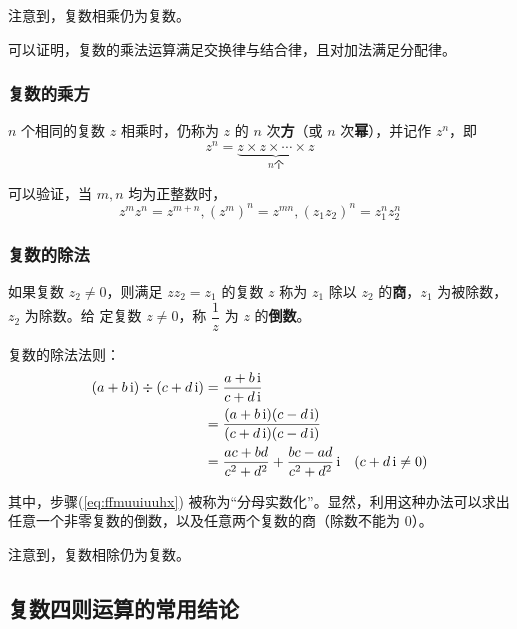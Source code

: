 \documentclass[a4paper,openany]{ctexbook}
\newcommand{\ii}{\,\mathrm{i}}
\begin{document}
注意到，复数相乘仍为复数。

可以证明，复数的乘法运算满足交换律与结合律，且对加法满足分配律。

\subsubsection{复数的乘方}

\(n\) 个相同的复数 \(z\) 相乘时，仍称为 \(z\) 的 \(n\) 次\textbf{方}（或 \(n\) 次\textbf{幂}），并记作 \(z^n\)，即
\[z^n=\underbrace{z\times z\times \cdots \times z}_{n\text{个}}\]

可以验证，当 \(m,n\) 均为正整数时，
\[z^mz^n=z^{m+n},(z^m)^n=z^{mn},(z_1z_2)^n=z_1^nz_2^n\]

\subsubsection{复数的除法}

如果复数 \(z_2\ne 0\)，则满足 \(zz_2=z_1\) 的复数 \(z\) 称为 \(z_1\) 除以 \(z_2\) 的\textbf{商}，\(z_1\) 为被除数，\(z_2\) 为除数。给
定复数 \(z\ne 0\)，称 \(\dfrac{1}{z}\) 为 \(z\) 的\textbf{倒数}。

复数的除法法则：
\begin{align}
    (a+b\ii)\div (c+d\ii) & =\frac{a+b\ii}{c+d\ii}                                              \notag                \\
                          & =\frac{(a+b\ii)(c-d\ii)}{(c+d\ii)(c-d\ii)}                          \label{eq:ffmuuiuuhx} \\
                          & =\frac{ac+bd}{c^2+d^2}+\frac{bc-ad}{c^2+d^2}\ii \quad (c+d\ii\ne 0) \notag
\end{align}

其中，步骤(\ref{eq:ffmuuiuuhx}) 被称为“分母实数化”。显然，利用这种办法可以求出任意一个非零复数的倒数，以及任意两个复数的商（除数不能为 \(0\)）。

注意到，复数相除仍为复数。

\subsection{复数四则运算的常用结论}
\end{document}
